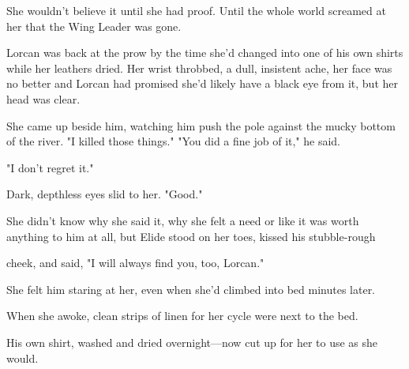 She wouldn't believe it until she had proof. Until the whole world screamed at her that the Wing Leader was gone.

Lorcan was back at the prow by the time she'd changed into one of his own shirts while her leathers dried. Her wrist throbbed, a dull, insistent ache, her face was no better and Lorcan had promised she'd likely have a black eye from it, but  her head was clear.

She came up beside him, watching him push the pole against the mucky bottom of the river. "I killed those things." "You did a fine job of it," he said.

"I don't regret it."

Dark, depthless eyes slid to her. "Good."

She didn't know why she said it, why she felt a need or like it was worth anything to him at all, but Elide stood on her toes, kissed his stubble-rough

cheek, and said, "I will always find you, too, Lorcan."

She felt him staring at her, even when she'd climbed into bed minutes later.

When she awoke, clean strips of linen for her cycle were next to the bed.

His own shirt, washed and dried overnight---now cut up for her to use as she would.
